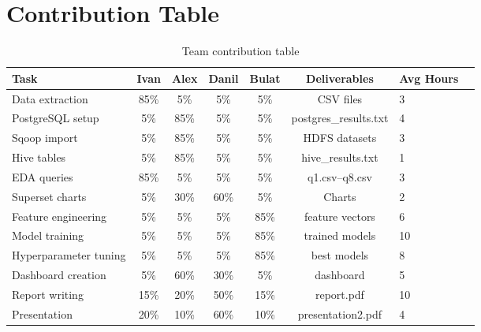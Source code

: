 \documentclass[12pt,a4paper]{article}
\begin{document}
\section{Contribution Table}

\begin{table}[H]
\centering
\small
\begin{tabular}{p{3cm}cccccp{2cm}c}
\toprule
\textbf{Task} & \textbf{Ivan} & \textbf{Alex} & \textbf{Danil} & \textbf{Bulat} & \textbf{Deliverables} & \textbf{Avg Hours} \\
\midrule
Data extraction & 85\% & 5\% & 5\% & 5\% & CSV files & 3 \\
\midrule
PostgreSQL setup & 5\% & 85\% & 5\% & 5\% & postgres\_results.txt & 4 \\
\midrule
Sqoop import & 5\% & 85\% & 5\% & 5\% & HDFS datasets & 3 \\
\midrule
Hive tables & 5\% & 85\% & 5\% & 5\% & hive\_results.txt & 1 \\
\midrule
EDA queries & 85\% & 5\% & 5\% & 5\% & q1.csv--q8.csv & 3 \\
\midrule
Superset charts & 5\% & 30\% & 60\% & 5\% & Charts & 2 \\
\midrule
Feature engineering & 5\% & 5\% & 5\% & 85\% & feature vectors & 6 \\
\midrule
Model training & 5\% & 5\% & 5\% & 85\% & trained models & 10 \\
\midrule
Hyperparameter tuning & 5\% & 5\% & 5\% & 85\% & best models & 8 \\
\midrule
Dashboard creation & 5\% & 60\% & 30\% & 5\% & dashboard & 5 \\
\midrule
Report writing & 15\% & 20\% & 50\% & 15\% & report.pdf & 10 \\
\midrule
Presentation & 20\% & 10\% & 60\% & 10\% & presentation2.pdf & 4 \\
\bottomrule
\end{tabular}
\caption{Team contribution table}
\end{table}
\end{document}
